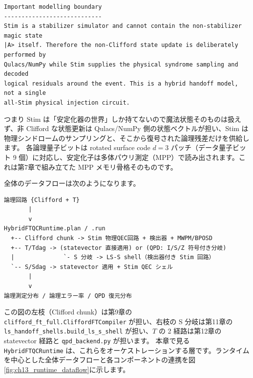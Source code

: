 \begin{lstlisting}[caption={src/stages/01\_mpp/src/ftqc/hybrid\_ftqc\_runtime.py 冒頭のモデル境界の説明}]
Important modelling boundary
----------------------------
Stim is a stabilizer simulator and cannot contain the non-stabilizer magic state
|A> itself. Therefore the non-Clifford state update is deliberately performed by
Qulacs/NumPy while Stim supplies the physical syndrome sampling and decoded
logical residuals around the event. This is a hybrid handoff model, not a single
all-Stim physical injection circuit.
\end{lstlisting}

つまり Stim は「安定化器の世界」しか持てないので魔法状態そのものは扱えず、非 Clifford な状態更新は Qulacs/NumPy 側の状態ベクトルが担い、Stim は物理シンドロームのサンプリングと、そこから復号された論理残差だけを供給します。
各論理量子ビットは rotated surface code $d=3$ パッチ（データ量子ビット 9 個）に対応し、安定化子は多体パウリ測定（MPP）で読み出されます。これは第7章で組み立てた MPP メモリ骨格そのものです。

全体のデータフローは次のようになります。

\begin{lstlisting}[language={}, caption={HybridFTQCRuntime の全体データフロー（README.md の記述に基づく）}]
論理回路 {Clifford + T}
       |
       v
HybridFTQCRuntime.plan / .run
  +-- Clifford chunk -> Stim 物理QEC回路 + 検出器 + MWPM/BPOSD
  +-- T/Tdag -> (statevector 直接適用) or (QPD: I/S/Z 符号付き分岐)
  |              `- S 分岐 -> LS-S shell（検出器付き Stim 回路）
  `-- S/Sdag -> statevector 適用 + Stim QEC シェル
       |
       v
論理測定分布 / 論理エラー率 / QPD 復元分布
\end{lstlisting}

この図の左枝（Clifford chunk）は第9章の \texttt{clifford\_ft\_full.CliffordFTCompiler} が担い、右枝の S 分岐は第11章の \texttt{ls\_handoff\_shells.build\_ls\_s\_shell} が担い、$T$ の 2 経路は第12章の statevector 経路と \texttt{qpd\_backend.py} が担います。
本章で見る \texttt{HybridFTQCRuntime} は、これらをオーケストレーションする層です。ランタイムを中心とした全体データフローと各コンポーネントの連携を図\ref{fig:ch13_runtime_dataflow}に示します。

